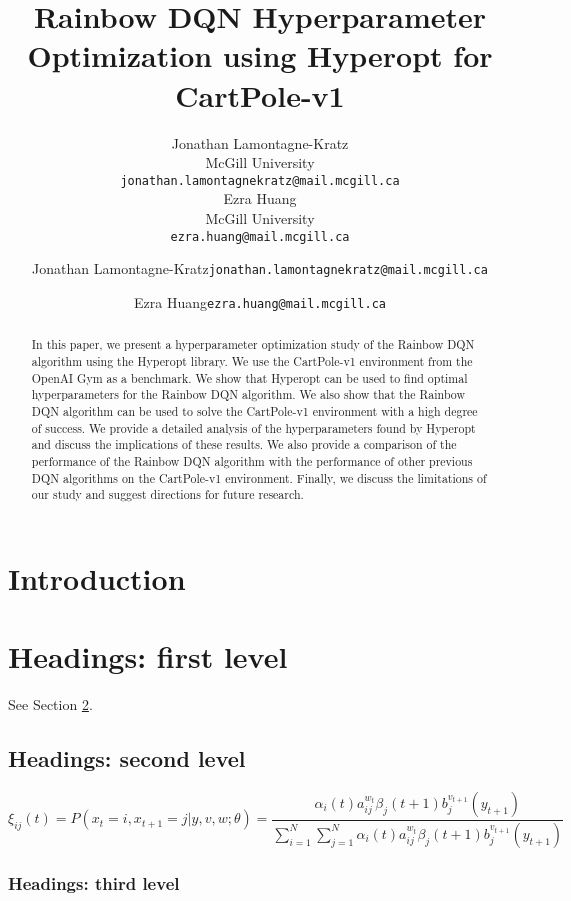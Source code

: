 \documentclass{article}
\title{Rainbow DQN Hyperparameter Optimization using Hyperopt for CartPole-v1
}
\author{%
  Jonathan Lamontagne-Kratz\\
  McGill University\\
  \texttt{jonathan.lamontagnekratz@mail.mcgill.ca} \\
  \And
  {Ezra Huang} \\
  McGill University\\
  \texttt{ezra.huang@mail.mcgill.ca} \\
}
\author[1]{%
	{\usebox\hspace{1mm}Jonathan Lamontagne-Kratz{\texttt{jonathan.lamontagnekratz@mail.mcgill.ca}}}%
}
\author[1,2]{%
    {\usebox\hspace{1mm}Ezra Huang{\texttt{ezra.huang@mail.mcgill.ca}}}%
}
\begin{document}
\maketitle

\begin{abstract}
    In this paper, we present a hyperparameter optimization study of the Rainbow DQN algorithm using the Hyperopt library. We use the CartPole-v1 environment from the OpenAI Gym as a benchmark. We show that Hyperopt can be used to find optimal hyperparameters for the Rainbow DQN algorithm. We also show that the Rainbow DQN algorithm can be used to solve the CartPole-v1 environment with a high degree of success. We provide a detailed analysis of the hyperparameters found by Hyperopt and discuss the implications of these results. We also provide a comparison of the performance of the Rainbow DQN algorithm with the performance of other previous DQN algorithms on the CartPole-v1 environment. Finally, we discuss the limitations of our study and suggest directions for future research.
\end{abstract}



\section{Introduction}
\lipsum[2]
\lipsum[3]


\section{Headings: first level}
\label{sec:headings}

\lipsum[4] See Section \ref{sec:headings}.

\subsection{Headings: second level}
\lipsum[5]
\begin{equation}
  \xi _{ij}(t)=P(x_{t}=i,x_{t+1}=j|y,v,w;\theta)= {\frac {\alpha _{i}(t)a^{w_t}_{ij}\beta _{j}(t+1)b^{v_{t+1}}_{j}(y_{t+1})}{\sum _{i=1}^{N} \sum _{j=1}^{N} \alpha _{i}(t)a^{w_t}_{ij}\beta _{j}(t+1)b^{v_{t+1}}_{j}(y_{t+1})}}
\end{equation}

\subsubsection{Headings: third level}
\lipsum[6]
\end{document}
